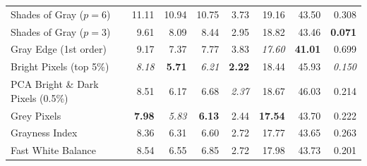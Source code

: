 \begin{longtable}{@{}>{\raggedright\arraybackslash}p{6.8cm}rrrrrrr@{}}
Shades of Gray ($p=6$)~\cite{shades_of_gray} & 11.11 & 10.94 & 10.75 & 3.73 & 19.16 & 43.50 & 0.308 \\
Shades of Gray ($p=3$)~\cite{shades_of_gray} & 9.61 & 8.09 & 8.44 & 2.95 & 18.82 & 43.46 & \textbf{0.071} \\
Gray Edge (1st order)~\cite{gray_edge} & 9.17 & 7.37 & 7.77 & 3.83 & \textit{17.60} & \textbf{41.01} & 0.699 \\
Bright Pixels (top 5\%)~\cite{bright_pixels} & \textit{8.18} & \textbf{5.71} & \textit{6.21} & \textbf{2.22} & 18.44 & 45.93 & \textit{0.150} \\
PCA Bright \& Dark Pixels (0.5\%)~\cite{cheng2014illuminant} & 8.51 & 6.17 & 6.68 & \textit{2.37} & 18.67 & 46.03 & 0.214 \\
Grey Pixels~\cite{yangGrayPixels} & \textbf{7.98} & \textit{5.83} & \textbf{6.13} & 2.44 & \textbf{17.54} & 43.70 & 0.222 \\
Grayness Index~\cite{qianFindingGrayPixels} & 8.36 & 6.31 & 6.60 & 2.72 & 17.77 & 43.65 & 0.263 \\
Fast White Balance~\cite{fast_wb_greyness} & 8.54 & 6.55 & 6.85 & 2.72 & 17.98 & 43.73 & 0.201 \\
\end{longtable}
\endgroup

